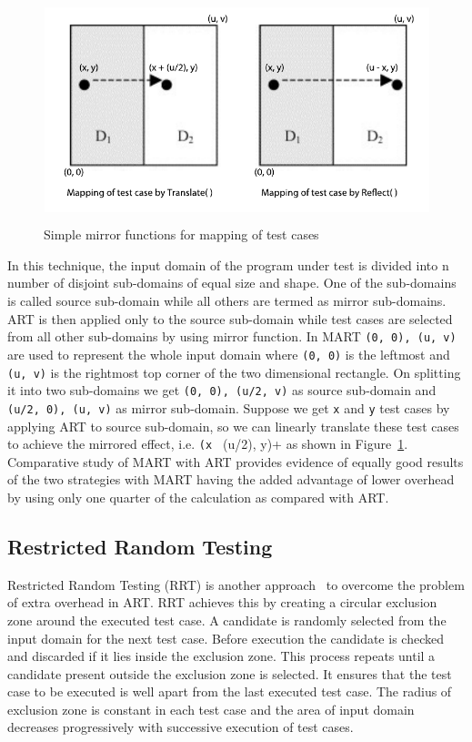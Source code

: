\begin{figure}[h]
\begin{center}
	\includegraphics[width=13.5cm, height=6.5cm ]{chapter2/mart2.pdf}
	\caption{Simple mirror functions for mapping of test cases~\cite{chen2004mirror}}
\label{fig:mirrorART}
\end{center}  
\end{figure}

In this technique, the input domain of the program under test is divided into n number of disjoint sub-domains of equal size and shape. One of the sub-domains is called source sub-domain while all others are termed as mirror sub-domains. ART is then applied only to the source sub-domain while test cases are selected from all other sub-domains by using mirror function. In MART \verb+(0, 0), (u, v)+ are used to represent the whole input domain where \verb+(0, 0)+ is the leftmost and \verb+(u, v)+ is the rightmost top corner of the two dimensional rectangle. On splitting it into two sub-domains we get \verb+(0, 0), (u/2, v)+ as source sub-domain and \verb+(u/2, 0), (u, v)+ as mirror sub-domain. Suppose we get \verb+x+ and \verb+y+ test cases by applying ART to source sub-domain, so we can linearly translate these test cases to achieve the mirrored effect, i.e. \verb+(x + (u/2), y)+ as shown in Figure~\ref{fig:mirrorART}. Comparative study of MART with ART provides evidence of equally good results of the two strategies with MART having the added advantage of lower overhead by using only one quarter of the calculation as compared with ART.


\subsection{Restricted Random Testing}
Restricted Random Testing (RRT) is another approach~\cite{chan2003normalized} to overcome the problem of extra overhead in ART. RRT achieves this by creating a circular exclusion zone around the executed test case. A candidate is randomly selected from the input domain for the next test case. Before execution the candidate is checked and discarded if it lies inside the exclusion zone. This process repeats until a candidate present outside the exclusion zone is selected. It ensures that the test case to be executed is well apart from the last executed test case. The radius of exclusion zone is constant in each test case and the area of input domain decreases progressively with successive execution of test cases.

